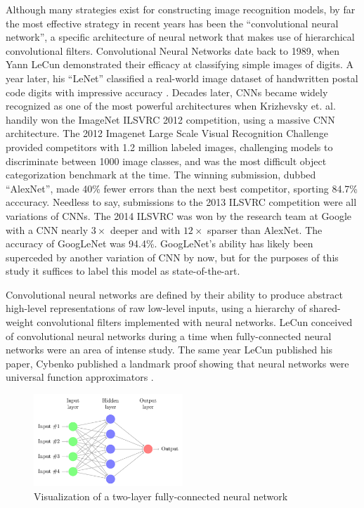 \documentclass[midd]{thesis}
\begin{document}
Although many strategies exist for constructing image recognition models, by far the most effective strategy in recent years has been the ``convolutional neural network'', a specific architecture of neural network that makes use of hierarchical convolutional filters. Convolutional Neural Networks date back to 1989, when Yann LeCun demonstrated their efficacy at classifying simple images of digits\cite{lecun1989generalization}. A year later, his ``LeNet'' classified a real-world image dataset of handwritten postal code digits with impressive accuracy \cite{Cun90handwrittendigit}. Decades later, CNNs became widely recognized as one of the most powerful architectures when Krizhevsky et. al. \cite{NIPS2012_4824} handily won the ImageNet ILSVRC 2012 competition, using a massive CNN architecture. The 2012 Imagenet Large Scale Visual Recognition Challenge provided competitors with 1.2 million labeled images, challenging models to discriminate between 1000 image classes, and was the most difficult object categorization benchmark at the time. The winning submission, dubbed ``AlexNet'', made 40\% fewer errors than the next best competitor, sporting 84.7\% acccuracy. Needless to say, submissions to the 2013 ILSVRC competition were all variations of CNNs. The 2014 ILSVRC was won by the research team at Google with a CNN nearly $3\times$ deeper and with $12\times$ sparser than AlexNet. The accuracy of GoogLeNet was 94.4\%. GoogLeNet's ability has likely been superceded by another variation of CNN by now, but for the purposes of this study it suffices to label this model as state-of-the-art.

Convolutional neural networks are defined by their ability to produce abstract high-level representations of raw low-level inputs, using a hierarchy of shared-weight convolutional filters implemented with neural networks. LeCun conceived of convolutional neural networks during a time when fully-connected neural networks were an area of intense study. The same year LeCun published his paper, Cybenko published a landmark proof showing that neural networks were universal function approximators \cite{cybenko1989approximation}. 

\begin{figure}[h]
\centering
\includegraphics[width=0.5\textwidth]{visualizations/nn.png}
\caption{Visualization of a two-layer fully-connected neural network}
\label{fig:nn}
\end{figure}
\end{document}
